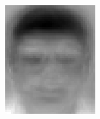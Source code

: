 	\begin{figure}[H]
	  \centering
	  \begin{minipage}[b]{0.2\textwidth}
	    \includegraphics[width=\textwidth]{season3/304/images/eigenface1.jpg}
	  \end{minipage}
	\hspace{0.2cm}
	  \begin{minipage}[b]{0.2\textwidth}

\end{minipage}
\end{figure}
